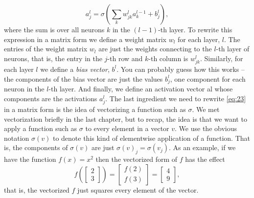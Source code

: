 \documentclass[a4paper,twoside,10pt]{book}
\begin{document}
\begin{equation}
	a^{l}_j = \sigma\left( \sum_k w^{l}_{jk} a^{l-1}_k + b^l_j \right),\label{eq:23}
\end{equation}
where the sum is over all neurons $k$ in the $(l-1)$-th layer. To rewrite this expression in a matrix form we define a weight matrix $w_l$ for each layer, $l$. The entries of the weight matrix $w_l$ are just the weights connecting to the $l$-th layer of neurons, that is, the entry in the $j$-th row and $k$-th column is $w^l_{jk}$. Similarly, for each layer $l$ we define a \textit{bias vector}, $b^l$. You can probably guess how this works -- the components of the bias vector are just the values $b^l_j$, one component for each neuron in the $l$-th layer. And finally, we define an activation vector al whose components are the activations $a^l_j$.
The last ingredient we need to rewrite \ref{eq:23} in a matrix form is the idea of vectorizing a function such as $\sigma$. We met vectorization briefly in the last chapter, but to recap, the idea is that we want to apply a function such as $\sigma$ to every element in a vector $v$. We use the obvious notation $\sigma(v)$ to denote this kind of elementwise application of a function. That is, the components of $\sigma(v)$ are just $\sigma(v)_j = \sigma(v_j)$. As an example, if we have the function $f(x)=x^2$ then the vectorized form of $f$ has the effect
\begin{equation}
f\left(\left[ \begin{array}{c} 2 \\ 3 \end{array} \right] \right)
= \left[ \begin{array}{c} f(2) \\ f(3) \end{array} \right]
= \left[ \begin{array}{c} 4 \\ 9 \end{array} \right],
\label{eq:24}
\end{equation}
that is, the vectorized $f$ just squares every element of the vector.
\end{document}
